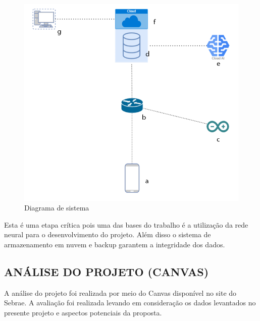 \begin{figure}[!h]
\centering
\caption{Diagrama de sistema}
\label{fig:picture16}
\includegraphics[scale=0.8]{Illustrations/diagrama de sistema 2.png}
\end{figure}
Esta é uma etapa crítica pois uma das bases do trabalho é a utilização da rede neural para o desenvolvimento do projeto. Além disso o sistema de armazenamento em nuvem e backup garantem a integridade dos dados.
\subsection*{ANÁLISE DO PROJETO (CANVAS)}

A análise do projeto foi realizada por meio do Canvas disponível no site do Sebrae. A avaliação foi realizada levando em consideração os dados levantados no presente projeto e aspectos potenciais da proposta.


